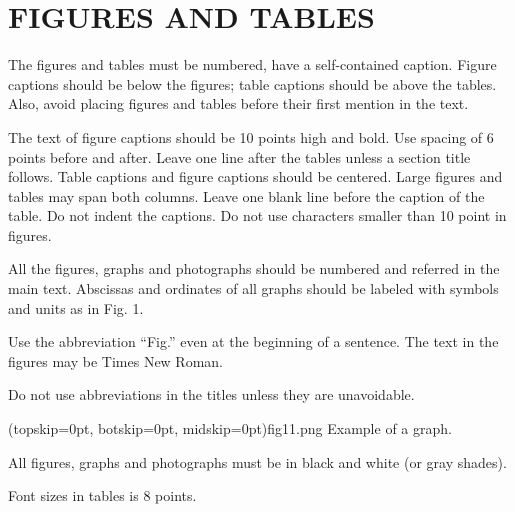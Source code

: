 \documentclass{ieeeijc}
\begin{document}
\section{FIGURES AND TABLES}
The figures and tables must be numbered, have a self-contained caption. Figure captions should be below the figures; table captions should be above the tables. Also, avoid placing figures and tables before their first mention in the text. 

The text of figure captions should be 10 points high and bold. Use spacing of 6 points before and after. Leave one line after the tables unless a section title follows. Table captions and figure captions should be centered. Large figures and tables may span both columns. Leave one blank line before the caption of the table. Do not indent the captions. Do not use characters smaller than 10 point in figures. 

All the figures, graphs and photographs should be numbered and referred in the main text. Abscissas and ordinates of all graphs should be labeled with symbols and units as in Fig. 1.

Use the abbreviation “Fig.” even at the beginning of a sentence. The text in the figures may be Times New Roman.

Do not use abbreviations in the titles unless they are unavoidable.

\Figure[t!](topskip=0pt, botskip=0pt, midskip=0pt){fig11.png}
{Example of a graph. \label{fig11}}

All figures, graphs and photographs must be in black and white (or gray shades).

Font sizes in tables is 8 points.
\end{document}
